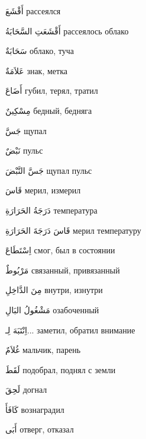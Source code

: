\documentclass[a5paper]{article}
\newcommand\textstyleDropCaps[1]{#1}
\newcommand\textstyleCaptioncharacters[1]{#1}
\begin{document}
\textstyleCaptioncharacters{أَقْشَعَ }\textstyleDropCaps{рассеялся‎}

\textstyleCaptioncharacters{أَقْشَعَتِ السَّحَابَةُ }\textstyleDropCaps{рас­сеялось облако‎}

\textstyleCaptioncharacters{سَحَابَةٌ }\textstyleDropCaps{облако, туча‎}

\textstyleCaptioncharacters{عَلاَمَةٌ }\textstyleDropCaps{знак, метка‎}

\textstyleCaptioncharacters{أَضَاعَ }\textstyleDropCaps{губил, терял, тратил‎}

\textstyleCaptioncharacters{مِسْكِينٌ }\textstyleDropCaps{бедный, бедняга‎}

\textstyleCaptioncharacters{جَسَّ }\textstyleDropCaps{щупал‎}

\textstyleCaptioncharacters{نَبْضٌ }\textstyleDropCaps{пульс‎}

\textstyleCaptioncharacters{جَسَّ النَّبْضَ }\textstyleDropCaps{щупал пульс‎}

\textstyleCaptioncharacters{قَاسَ }\textstyleDropCaps{мерил, измерил‎}

\textstyleCaptioncharacters{دَرَجَةُ الحَرَارَةِ }\textstyleDropCaps{темпера­тура‎}

\textstyleCaptioncharacters{قَاسَ دَرَجَةَ الحَرَارَةِ }\textstyleDropCaps{мерил температуру‎}

\textstyleCaptioncharacters{اِسْتَطَاعَ }\textstyleDropCaps{смог, был в со­стоянии‎}

\textstyleCaptioncharacters{مَرْبُوطٌ }\textstyleDropCaps{связанный, при­вязанный‎}

\textstyleCaptioncharacters{مِنَ الدَّاخِلِ }\textstyleDropCaps{внутри, из­нутри‎}

\textstyleCaptioncharacters{مَشْغُولُ البَالِ }\textstyleDropCaps{озабо­ченный‎}

\textstyleCaptioncharacters{اِنْتَبَهَ لِـ... }\textstyleDropCaps{заметил, обра­тил внимание‎}

\textstyleCaptioncharacters{غُلاَمٌ }\textstyleDropCaps{мальчик, парень‎}

\textstyleCaptioncharacters{لَقَطَ }\textstyleDropCaps{подобрал, поднял с земли‎}

\textstyleCaptioncharacters{لَحِقَ }\textstyleDropCaps{догнал‎}

\textstyleCaptioncharacters{كَافَأَ }\textstyleDropCaps{вознаградил‎}

\textstyleCaptioncharacters{أَبَى }\textstyleDropCaps{отверг, отказал‎}
\end{document}
